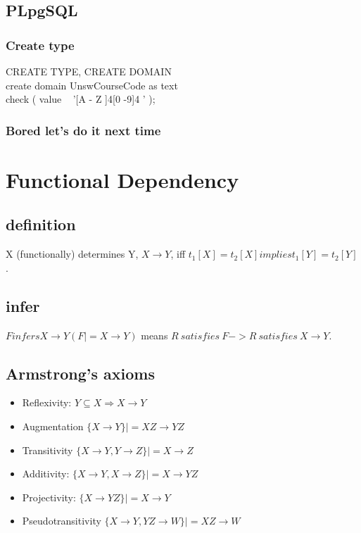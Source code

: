 \documentclass[a4paper]{scrartcl}
\begin{document}
  \subsection{PLpgSQL}
    \subsubsection{Create type}
      CREATE TYPE, CREATE DOMAIN \\
      create domain UnswCourseCode as text \\
      check ( value ~ '[A - Z ]{4}[0 -9]{4} ' );
    \subsubsection{Bored let's do it next time}
\section{Functional Dependency}
  \subsection{definition}
    X (functionally) determines Y, $X \rightarrow Y$, iff $t_1[X] = t_2[X] implies t_1[Y] = t_2[Y]$.
  \subsection{infer}
    $F infers X \rightarrow Y ( F |= X \rightarrow Y)$ means $R~satisfies~F -> R~satisfies~X\rightarrow Y$.
  \subsection{Armstrong's axioms}
    \begin{itemize}
      \item Reflexivity: $Y \subseteq X \Rightarrow X \rightarrow Y$
      \item Augmentation $\{X \rightarrow Y\} |= XZ \rightarrow YZ$
      \item Transitivity $\{X \rightarrow Y, Y \rightarrow Z\} |= X \rightarrow Z$
      \item Additivity: $\{X \rightarrow Y, X \rightarrow Z\} |= X \rightarrow YZ$
      \item Projectivity: $\{X \rightarrow YZ\} |= X \rightarrow Y$
      \item Pseudotransitivity $\{X \rightarrow Y, YZ \rightarrow W\} |= XZ \rightarrow W$
    \end{itemize}
\end{document}
